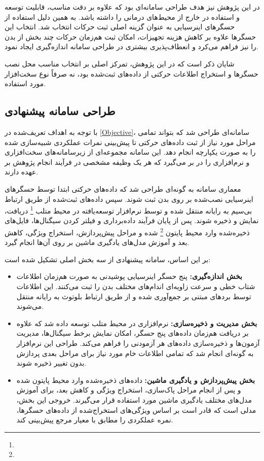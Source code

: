 در این پژوهش نیز هدف طراحی سامانه‌ای بود که علاوه بر دقت مناسب، قابلیت توسعه و استفاده در خارج از محیط‌های درمانی را داشته باشد. به همین دلیل استفاده از حسگرهای اینرسیایی به عنوان گزینه اصلی ثبت حرکات انتخاب شد. انتخاب این حسگرها علاوه بر کاهش هزینه تجهیزات، امکان ثبت هم‌زمان حرکات چند بخش از بدن را نیز فراهم می‌کرد و انعطاف‌پذیری بیشتری در طراحی سامانه اندازه‌گیری ایجاد نمود.

شایان ذکر است که در این پژوهش، تمرکز اصلی بر انتخاب مناسب محل نصب حسگرها و استخراج اطلاعات حرکتی از داده‌های ثبت‌شده بود، نه صرفاً نوع سخت‌افزار مورد استفاده.

\subsection{طراحی سامانه پیشنهادی}

با توجه به اهداف تعریف‌شده در 
\autoref{Objective}،
سامانه‌ای طراحی شد که بتواند تمامی مراحل مورد نیاز از ثبت داده‌های حرکتی تا پیش‌بینی نمرات عملکردی شبیه‌سازی شده را به صورت یکپارچه انجام دهد. این سامانه مجموعه‌ای از زیرسامانه‌های سخت‌افزاری و نرم‌افزاری را در بر می‌گیرد که هر یک وظیفه مشخصی در فرآیند انجام پژوهش بر عهده دارند.

معماری سامانه به گونه‌ای طراحی شد که داده‌های حرکتی ابتدا توسط حسگرهای اینرسیایی نصب‌شده بر روی بدن ثبت شوند. سپس داده‌های ثبت‌شده از طریق ارتباط بی‌سیم به رایانه منتقل شده و توسط نرم‌افزار توسعه‌یافته در محیط متلب 
\footnote{}
دریافت، نمایش و ذخیره شوند. پس از پایان فرآیند داده‌برداری و فیلتر کردن سیگنال‌ها، فایل‌های ذخیره‌شده وارد محیط پایتون
\footnote{}
 شده و مراحل پیش‌پردازش، استخراج ویژگی، کاهش بعد و آموزش مدل‌های یادگیری ماشین بر روی آن‌ها انجام گیرد.

بر این اساس، سامانه پیشنهادی از سه بخش اصلی تشکیل شده است:

\begin{itemize}
	\item []\textbf{بخش اندازه‌گیری:} پنج حسگر اینرسیایی پوشیدنی به صورت هم‌زمان اطلاعات شتاب خطی و سرعت زاویه‌ای اندام‌های مختلف بدن را ثبت می‌کنند. این اطلاعات توسط بردهای مبتنی بر  جمع‌آوری شده و از طریق ارتباط بلوتوث به رایانه منتقل می‌شوند.
	
	\item []\textbf{بخش مدیریت و ذخیره‌سازی:} نرم‌افزاری در محیط متلب توسعه داده شد که علاوه بر دریافت هم‌زمان داده‌های پنج حسگر، امکان نمایش برخط سیگنال‌ها، مدیریت آزمون‌ها و ذخیره‌سازی داده‌های هر آزمودنی را فراهم می‌کند. طراحی این نرم‌افزار به گونه‌ای انجام شد که تمامی اطلاعات خام مورد نیاز برای مراحل بعدی پردازش بدون تغییر ذخیره شوند.
	
	\item []\textbf{بخش پیش‌پردازش و یادگیری ماشین:} داده‌های ذخیره‌شده وارد محیط پایتون شده و پس از انجام مراحل پاک‌سازی، استخراج ویژگی و کاهش بعد، برای آموزش مدل‌های مختلف یادگیری ماشین مورد استفاده قرار می‌گیرند. خروجی این بخش، مدلی است که قادر است بر اساس ویژگی‌های استخراج‌شده از داده‌های حسگرها، نمره عملکردی را مطابق با معیار مرجع پیش‌بینی کند.
\end{itemize}

